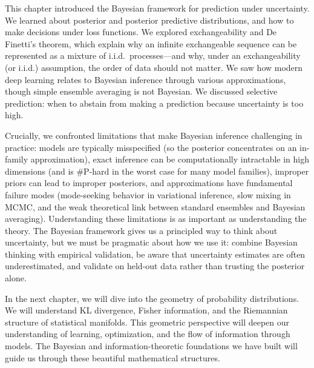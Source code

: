 This chapter introduced the Bayesian framework for prediction under uncertainty. We learned about posterior and posterior predictive distributions, and how to make decisions under loss functions. We explored exchangeability and De Finetti's theorem, which explain why an infinite exchangeable sequence can be represented as a mixture of i.i.d.\ processes---and why, under an exchangeability (or i.i.d.) assumption, the order of data should not matter. We saw how modern deep learning relates to Bayesian inference through various approximations, though simple ensemble averaging is not Bayesian. We discussed selective prediction: when to abstain from making a prediction because uncertainty is too high.

Crucially, we confronted limitations that make Bayesian inference challenging in practice: models are typically misspecified (so the posterior concentrates on an in-family approximation), exact inference can be computationally intractable in high dimensions (and is \#P-hard in the worst case for many model families), improper priors can lead to improper posteriors, and approximations have fundamental failure modes (mode-seeking behavior in variational inference, slow mixing in MCMC, and the weak theoretical link between standard ensembles and Bayesian averaging). Understanding these limitations is as important as understanding the theory. The Bayesian framework gives us a principled way to think about uncertainty, but we must be pragmatic about how we use it: combine Bayesian thinking with empirical validation, be aware that uncertainty estimates are often underestimated, and validate on held-out data rather than trusting the posterior alone.

In the next chapter, we will dive into the geometry of probability distributions. We will understand KL divergence, Fisher information, and the Riemannian structure of statistical manifolds. This geometric perspective will deepen our understanding of learning, optimization, and the flow of information through models. The Bayesian and information-theoretic foundations we have built will guide us through these beautiful mathematical structures.
